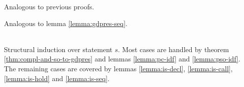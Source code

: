 \begin{proofatend}
    Analogous to previous proofs.
\end{proofatend}

\begin{proofatend}
    Analogous to lemma \ref{lemma:gdpres-seq}.
\end{proofatend}

\begin{proofatend}~\\
    Structural induction over statement $s$.
    Most cases are handled by theorem \ref{thm:compl-and-so-to-gdpres} and lemmas \ref{lemma:pc-idf} and \ref{lemma:pso-idf}.
    The remaining cases are covered by lemmas 
    \ref{lemma:is-decl},
    \ref{lemma:is-call},
    \ref{lemma:is-hold} and
    \ref{lemma:is-seq}.
\end{proofatend}

